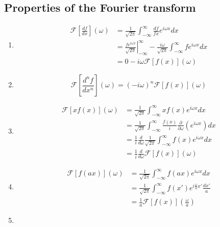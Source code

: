 \documentclass{physics_notes}
\begin{document}
\subsection{Properties of the Fourier transform}

\begin{enumerate}
	\item{
	\begin{align*}
	\mathcal{F}\left[\frac{df}{dx}\right](\omega) &= \frac{1}{\sqrt{2\pi}} \int_{-\infty}^\infty \frac{df}{fx} e^{i\omega x} dx \\
	&= \left.\frac{f e^{i\omega x}}{\sqrt{2\pi}}\right|^{\infty}_{-\infty} - \frac{i\omega}{\sqrt{2\pi}}\int^\infty_{-\infty} f e^{i\omega x} dx \\
	&= 0 - i\omega \mathcal{F}\left[f(x)\right](\omega)
	\end{align*}
	}
	\item{
	\[\mathcal{F}\left[\frac{d^n f}{dx^n}\right](\omega) = (- i\omega)^n \mathcal{F}\left[f(x)\right](\omega)\]
	}
	\item{
	\begin{align*}
	\mathcal{F}\left[x f(x)\right](\omega) &= \frac{1}{\sqrt{2\pi}} \int_{-\infty}^\infty x f(x) e^{i\omega x} dx \\
	&= \frac{1}{\sqrt{2\pi}} \int_{-\infty}^\infty \frac{f(x)}{i} \frac{\partial}{\partial\omega}\left(e^{i\omega x}\right) dx\\
	&= \frac{1}{i}\frac{d}{d\omega} \frac{1}{\sqrt{2\pi}}\int_{-\infty}^{\infty} f(x) e^{i\omega x} dx \\
	&= \frac{1}{i} \frac{d}{d\omega}\mathcal{F}\left[f(x)\right](\omega)
	\end{align*}
	}
	\item{
	\begin{align*}
	\mathcal{F}\left[f(ax)\right](\omega) &= \frac{1}{\sqrt{2\pi}} \int_{-\infty}^\infty f(ax)e^{i\omega x} dx \\
	&= \frac{1}{\sqrt{2\pi}} \int_{-\infty}^\infty f(x') e^{i\frac{\omega}{a}x'} \frac{dx'}{a} \\
	&= \frac{1}{a}\mathcal{F}\left[f(x)\right]\left(\frac{\omega}{a}\right)
	\end{align*}}
	\item{
}
\end{enumerate}
\end{document}
